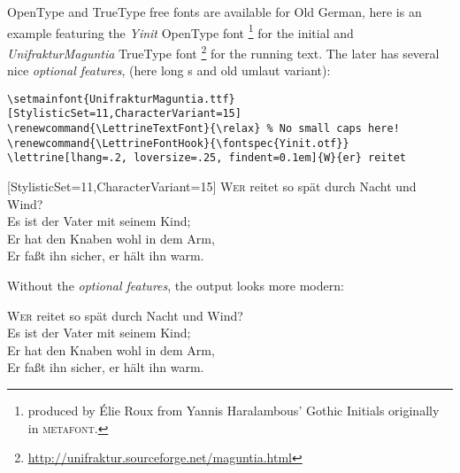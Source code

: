 \documentclass[12pt,paper=a4,german,french,british]{scrartcl}
\newcommand*{\MF}{{\small\scshape metafont}}
\begin{document}
\vspace{.5\baselineskip}
OpenType and TrueType free fonts are available for Old German, here is an example
featuring the \textit{Yinit} OpenType font%
\footnote{produced by Élie Roux from Yannis Haralambous’ Gothic Initials
  originally in \MF.}
for the initial and \textit{UnifrakturMaguntia} TrueType font%
\footnote{\url{http://unifraktur.sourceforge.net/maguntia.html}}
for the running text.  The later has several nice \textit{optional features},
(here long s and old umlaut variant):

\verb+\setmainfont{UnifrakturMaguntia.ttf}[StylisticSet=11,CharacterVariant=15]+\\
\verb+\renewcommand{\LettrineTextFont}{\relax} % No small caps here!+ \\
\verb+\renewcommand{\LettrineFontHook}{\fontspec{Yinit.otf}}+\\
\verb+\lettrine[lhang=.2, loversize=.25, findent=0.1em]{W}{er} reitet+

\begin{de}\Large
\setmainfont{UnifrakturMaguntia.ttf}[StylisticSet=11,CharacterVariant=15]
\renewcommand{\LettrineTextFont}{\relax}
\renewcommand{\LettrineFontHook}{\fontspec{Yinit.otf}}
\lettrine[lhang=.2, loversize=.25, findent=0.1em]
{W}{er} reitet so spät durch Nacht und Wind?\\
Es ist der Vater mit seinem Kind;\\
Er hat den Knaben wohl in dem Arm,\\
Er faßt ihn sicher, er hält ihn warm.\par
\end{de}

\vspace{.5\baselineskip}
Without the \textit{optional features}, the output looks more modern:

\begin{otherlanguage}{german}\Large
\setmainfont{UnifrakturMaguntia.ttf}
\renewcommand{\LettrineTextFont}{\relax}
\renewcommand{\LettrineFontHook}{\fontspec{Yinit.otf}}
\lettrine[lhang=.2, loversize=.25, findent=0.1em]
{W}{er} reitet so spät durch Nacht und Wind?\\
Es ist der Vater mit seinem Kind;\\
Er hat den Knaben wohl in dem Arm,\\
Er faßt ihn sicher, er hält ihn warm.\par
\end{otherlanguage}
\end{document}
